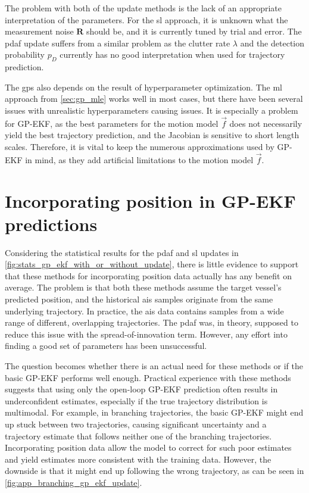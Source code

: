 The problem with both of the update methods is the lack of an appropriate interpretation of the parameters. For the \acrshort{sl} approach, it is unknown what the measurement noise $\boldsymbol{R}$ should be, and it is currently tuned by trial and error. The \acrshort{pdaf} update suffers from a similar problem as the clutter rate $\lambda$ and the detection probability $p_D$ currently has no good interpretation when used for trajectory prediction. 

The \acrshort{gp}s also depends on the result of hyperparameter optimization. The \acrshort{ml} approach from \cref{sec:gp_mle} works well in most cases, but there have been several issues with unrealistic hyperparameters causing issues. It is especially a problem for GP-EKF, as the best parameters for the motion model $\vec{f}$ does not necessarily yield the best trajectory prediction, and the Jacobian is sensitive to short length scales. Therefore, it is vital to keep the numerous approximations used by GP-EKF in mind, as they add artificial limitations to the motion model $\vec{f}$.

\section{Incorporating position in GP-EKF predictions}
Considering the statistical results for the \acrshort{pdaf} and \acrshort{sl} updates in \cref{fig:stats_gp_ekf_with_or_without_update}, there is little evidence to support that these methods for incorporating position data actually has any benefit on average. The problem is that both these methods assume the target vessel's predicted position, and the historical \acrshort{ais} samples originate from the same underlying trajectory. In practice, the \acrshort{ais} data contains samples from a wide range of different, overlapping trajectories. The \acrshort{pdaf} was, in theory, supposed to reduce this issue with the spread-of-innovation term. However, any effort into finding a good set of parameters has been unsuccessful. 

The question becomes whether there is an actual need for these methods or if the basic GP-EKF performs well enough. Practical experience with these methods suggests that using only the open-loop GP-EKF prediction often results in underconfident estimates, especially if the true trajectory distribution is multimodal. For example, in branching trajectories, the basic GP-EKF might end up stuck between two trajectories, causing significant uncertainty and a trajectory estimate that follows neither one of the branching trajectories. Incorporating position data allow the model to correct for such poor estimates and yield estimates more consistent with the training data. However, the downside is that it might end up following the wrong trajectory, as can be seen in \cref{fig:app_branching_gp_ekf_update}.

